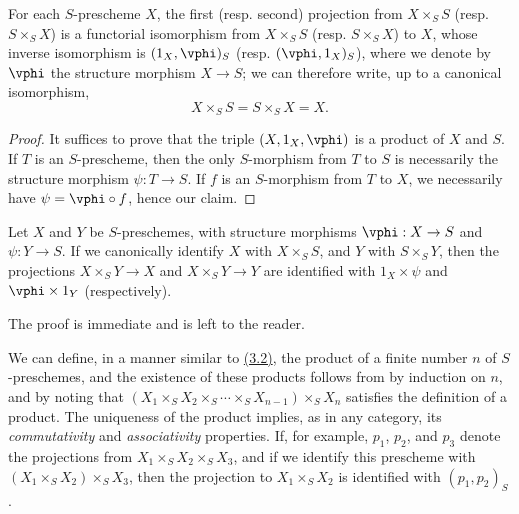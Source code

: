 \begin{proposition}[3.3.3]
\label{I.3.3.3}
For each $S$-prescheme $X$, the first (resp. second) projection from
$X\times_S S$ (resp. $S\times_S X$) is a functorial isomorphism from
$X\times_S S$ (resp. $S\times_S X$) to $X$, whose inverse isomorphism is
$(1_X,\vphi)_S$ (resp. $(\vphi,1_X)_S$), where we denote by $\vphi$ the
structure morphism $X\to S$; we can therefore write, up to a canonical
isomorphism,
\[
  X\times_S S=S\times_S X=X.
\]
\end{proposition}

\begin{proof}
It suffices to prove that the triple $(X,1_X,\vphi)$ is a product of $X$ and
$S$. If $T$ is an $S$-prescheme, then the only $S$-morphism from $T$ to $S$ is
necessarily the structure morphism $\psi:T\to S$. If $f$ is an $S$-morphism from
$T$ to $X$, we necessarily have $\psi=\vphi\circ f$, hence our claim.
\end{proof}

\begin{corollary}[3.3.4]
\label{I.3.3.4}
Let $X$ and $Y$ be $S$-preschemes, with structure morphisms $\vphi:X\to S$ and $\psi:Y\to S$. If we canonically identify $X$ with $X\times_S S$, and $Y$
with $S\times_S Y$, then the projections $X\times_S Y\to X$ and $X\times_S Y\to Y$
are identified with $1_X\times\psi$ and $\vphi\times 1_Y$ (respectively).
\end{corollary}

The proof is immediate and is left to the reader.

\begin{env}[3.3.5]
\label{I.3.3.5}
We can define, in a manner similar to \hyperref[subsection:I.3.2]{(3.2)}, the product of a
finite number $n$ of $S$-preschemes, and the existence of these products follows
from  by induction on $n$, and by noting that
$(X_1\times_S X_2\times_S\cdots\times_S X_{n-1})\times_S X_n$ satisfies the
definition of a product. The uniqueness of the product implies, as in any
category, its \emph{commutativity} and \emph{associativity} properties. If, for
example, $p_1$, $p_2$, and $p_3$ denote the projections from
$X_1\times_S X_2\times_S X_3$, and if we identify this prescheme with
$(X_1\times_S X_2)\times_S X_3$, then the projection to $X_1\times_S X_2$ is
identified with $(p_1,p_2)_S$.
\end{env}

